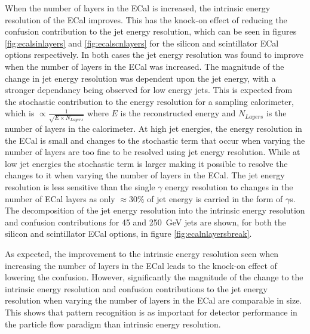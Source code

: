 When the number of layers in the ECal is increased, the intrinsic energy resolution of the ECal improves.  This has the knock-on effect of reducing the confusion contribution to the jet energy resolution, which can be seen in figures \ref{fig:ecalsinlayers} and \ref{fig:ecalscnlayers} for the silicon and scintillator ECal options respectively.  In both cases the jet energy resolution was found to improve when the number of layers in the ECal was increased.  The magnitude of the change in jet energy resolution was dependent upon the jet energy, with a stronger dependancy being observed for low energy jets.  This is expected from the stochastic contribution to the energy resolution for a sampling calorimeter, which is $\propto \frac{1}{\sqrt{E \times N_{Layers}}}$ where $E$ is the reconstructed energy and $N_{Layers}$ is the number of layers in the calorimeter.  At high jet energies, the energy resolution in the ECal is small and changes to the stochastic term that occur when varying the number of layers are too fine to be resolved using jet energy resolution.  While at low jet energies the stochastic term is larger making it possible to resolve the changes to it when varying the number of layers in the ECal.  The jet energy resolution is less sensitive than the single $\gamma$ energy resolution to changes in the number of ECal layers as only $\approx 30\%$ of jet energy is carried in the form of $\gamma$s.  The decomposition of the jet energy resolution into the intrinsic energy resolution and confusion contributions for 45 and 250~GeV jets are shown, for both the silicon and scintillator ECal options, in figure \ref{fig:ecalnlayersbreak}.  

As expected, the improvement to the intrinsic energy resolution seen when increasing the number of layers in the ECal leads to the knock-on effect of lowering the confusion.  However, significantly the magnitude of the change to the intrinsic energy resolution and confusion contributions to the jet energy resolution when varying the number of layers in the ECal are comparable in size.  This shows that pattern recognition is as important for detector performance in the particle flow paradigm than intrinsic energy resolution.  

